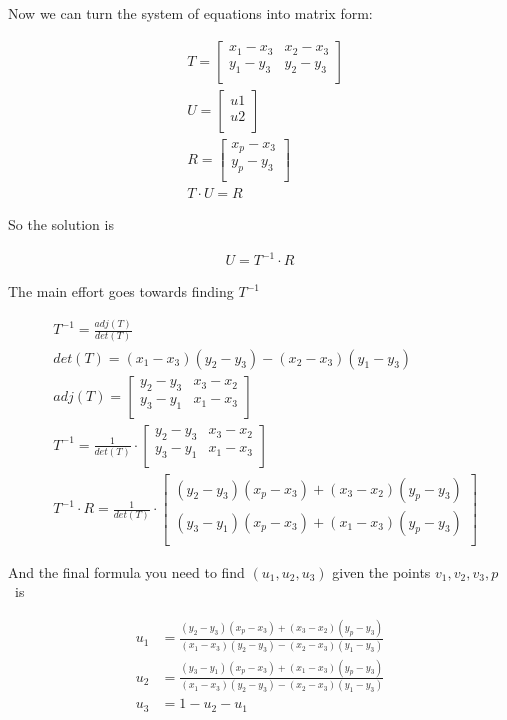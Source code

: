 \documentclass{article}
\begin{document}
Now we can turn the system of equations into matrix form:

\begin{align}
  & T =
  \begin{bmatrix}
    x_1 - x_3 & x_2 - x_3 \\
    y_1 - y_3 & y_2 - y_3 \\
  \end{bmatrix} \\
  & U = \begin{bmatrix}
    u1 \\ u2 \\
  \end{bmatrix}\\
  & R = \begin{bmatrix}
    x_p - x_3 \\
    y_p - y_3 \\
  \end{bmatrix} \\
  & T \cdot U = R
\end{align}

So the solution is

\begin{align}
  U = T^{-1} \cdot R
\end{align}

The main effort goes towards finding $T^{-1}$

\begin{align}
  & T^{-1} = \frac{adj(T)}{det(T)} \\
  & det(T) = (x_1 - x_3)(y_2 - y_3) - (x_2 - x_3)(y_1 - y_3) \\
  & adj(T) = \begin{bmatrix}
    y_2 - y_3 & x_3 - x_2 \\
    y_3 - y_1 & x_1 - x_3 \\
  \end{bmatrix} \\
  & T^{-1} = \frac{1}{det(T)} \cdot \begin{bmatrix}
    y_2 - y_3 & x_3 - x_2 \\
    y_3 - y_1 & x_1 - x_3 \\
  \end{bmatrix} \\
  & T^{-1}\cdot R = \frac{1}{det(T)} \cdot \begin{bmatrix}
    (y_2 - y_3)(x_p - x_3) + (x_3 - x_2)(y_p - y_3) \\
    (y_3 - y_1)(x_p - x_3) + (x_1 - x_3)(y_p - y_3) \\
  \end{bmatrix}
\end{align}

And the final formula you need to find $(u_1, u_2, u_3)$ given the points $v_1, v_2, v_3, p$~is

\begin{align}
  u_1 &= \frac{(y_2 - y_3)(x_p - x_3) + (x_3 - x_2)(y_p - y_3)}{(x_1 - x_3)(y_2 - y_3) - (x_2 - x_3)(y_1 - y_3)} \\
  u_2 &= \frac{(y_3 - y_1)(x_p - x_3) + (x_1 - x_3)(y_p - y_3)}{(x_1 - x_3)(y_2 - y_3) - (x_2 - x_3)(y_1 - y_3)} \\
  u_3 &= 1 - u_2 - u_1
\end{align}
\end{document}
